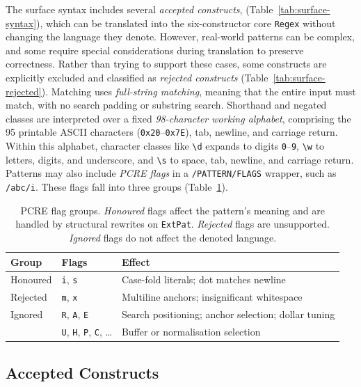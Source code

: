 The surface syntax includes several \emph{accepted constructs},
(Table~\ref{tab:surface-syntax}), 
which can be translated into the six-constructor core \texttt{Regex} 
without changing the language they denote. 
However, real-world patterns can be complex, 
and some require special considerations during translation to preserve correctness. 
Rather than trying to support these cases,
some constructs are explicitly excluded 
and classified as \emph{rejected constructs} (Table~\ref{tab:surface-rejected}).
Matching uses \emph{full-string matching}, 
meaning that the entire input must match, with no search padding or substring search.
Shorthand and negated classes are interpreted over a fixed
\emph{98-character working alphabet}, 
comprising the 95 printable ASCII characters (\verb|0x20|--\verb|0x7E|), 
tab, newline, and carriage return. 
Within this alphabet, character classes like \texttt{\textbackslash d} 
expands to digits \texttt{0}--\texttt{9},
\texttt{\textbackslash w} to letters, digits, and underscore, 
and \texttt{\textbackslash s} to space, tab, newline, and carriage return. 
Patterns may also include \emph{PCRE flags} in a \texttt{/PATTERN/FLAGS} wrapper, 
such as \texttt{/abc/i}.
These flags fall into three groups (Table~\ref{tab:flags}).
\begin{table}[ht]
\centering
\small
\setlength{\tabcolsep}{5pt}
\begin{tabular}{@{}lll@{}}
\hline
Group & Flags & Effect \\
\hline
Honoured & \texttt{i}, \texttt{s}
  & Case-fold literals; dot matches newline \\
Rejected & \texttt{m}, \texttt{x}
  & Multiline anchors; insignificant whitespace \\
Ignored & \texttt{R}, \texttt{A}, \texttt{E}
  & Search positioning; anchor selection; dollar tuning \\
       & \texttt{U}, \texttt{H}, \texttt{P}, \texttt{C}, \ldots
  & Buffer or normalisation selection \\
\hline
\end{tabular}
\caption{PCRE flag groups. \emph{Honoured} flags affect the pattern's
meaning and are handled by structural rewrites on \texttt{ExtPat}.
\emph{Rejected} flags are unsupported. \emph{Ignored} flags do not affect the
denoted language.}
\label{tab:flags}
\end{table}

%
%
%

\subsection{Accepted Constructs}
\label{sec:frontend-accepted}

